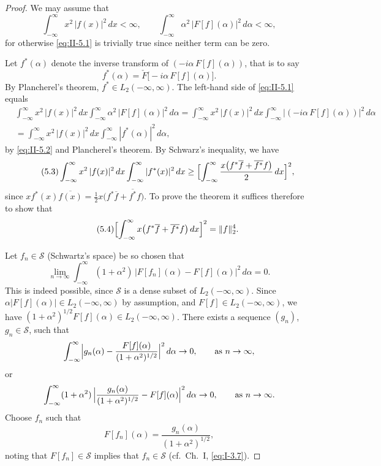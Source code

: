 \begin{proof}
We may assume that
\[
\int_{-\infty}^{\infty}x^{2}\,|f(x)|^{2}\,dx<\infty,\qquad
\int_{-\infty}^{\infty}\alpha^{2}\,|F[f](\alpha)|^{2}\,d\alpha<\infty,
\]
for otherwise \eqref{eq:II-5.1} is trivially true since neither term can be zero.

Let $f^{*}(\alpha)$ denote the inverse transform of $(-i\alpha\,F[f](\alpha))$, that is to say
\begin{equation}\tag{5.2}\label{eq:II-5.2}
f^{*}(\alpha)=\check F\bigl[-i\alpha\,F[f](\alpha)\bigr].
\end{equation}
By Plancherel's theorem, $f^{*}\in L_{2}(-\infty,\infty)$. The left-hand side of \eqref{eq:II-5.1} equals
\[
\begin{aligned}
&\int_{-\infty}^{\infty}x^{2}\,|f(x)|^{2}\,dx
\int_{-\infty}^{\infty}\alpha^{2}\,|F[f](\alpha)|^{2}\,d\alpha
= \int_{-\infty}^{\infty}x^{2}\,|f(x)|^{2}\,dx
\int_{-\infty}^{\infty}\bigl|(-i\alpha\,F[f](\alpha))\bigr|^{2}\,d\alpha\\
&= \int_{-\infty}^{\infty}x^{2}\,|f(x)|^{2}\,dx
\int_{-\infty}^{\infty}|f^{*}(\alpha)|^{2}\,d\alpha,
\end{aligned}
\]
by \eqref{eq:II-5.2} and Plancherel's theorem. By Schwarz's inequality, we have
\begin{equation}\tag{5.3}\label{eq:II-5.3}
\int_{-\infty}^{\infty}x^{2}\,|f(x)|^{2}\,dx
\int_{-\infty}^{\infty}|f^{*}(x)|^{2}\,dx
\ge \Bigl[\int_{-\infty}^{\infty}\frac{x\bigl(f^{*}\overline{f}+\overline{f^{*}}f\bigr)}{2}\,dx\Bigr]^{2},
\end{equation}
since $x f^{*}(x)\overline{f(x)}=\frac{1}{2}x\bigl(f^{*}\overline{f}+\overline{f^{*}}f\bigr)$. To prove the theorem it suffices therefore to show that
\begin{equation}\tag{5.4}\label{eq:II-5.4}
\Bigl[\int_{-\infty}^{\infty}x\bigl(f^{*}\overline{f}+\overline{f^{*}}f\bigr)\,dx\Bigr]^{2}=\|f\|_{2}^{4}.
\end{equation}

Let $f_{n}\in\mathcal S$ (Schwartz's space) be so chosen that
\begin{equation}\tag{5.5}\label{eq:II-5.5}
\lim_{n\to\infty}\int_{-\infty}^{\infty}(1+\alpha^{2})\,
\bigl|F[f_{n}](\alpha)-F[f](\alpha)\bigr|^{2}\,d\alpha=0.
\end{equation}
This is indeed possible, since $\mathcal S$ is a dense subset of $L_{2}(-\infty,\infty)$. Since $\alpha|F[f](\alpha)|\in L_{2}(-\infty,\infty)$ by assumption, and $F[f]\in L_{2}(-\infty,\infty)$, we have $(1+\alpha^{2})^{1/2}F[f](\alpha)\in L_{2}(-\infty,\infty)$. There exists a sequence $(g_{n})$, $g_{n}\in\mathcal S$, such that
\[
\int_{-\infty}^{\infty}\Bigl|g_{n}(\alpha)-\frac{F[f](\alpha)}{(1+\alpha^{2})^{1/2}}\Bigr|^{2}\,d\alpha\to 0,\qquad\text{as }n\to\infty,
\]
or
\[
\int_{-\infty}^{\infty}(1+\alpha^{2})\,
\Bigl|\frac{g_{n}(\alpha)}{(1+\alpha^{2})^{1/2}}-F[f](\alpha)\Bigr|^{2}\,d\alpha\to 0,\qquad\text{as }n\to\infty.
\]
Choose $f_{n}$ such that
\[
F[f_{n}](\alpha)=\frac{g_{n}(\alpha)}{(1+\alpha^{2})^{1/2}},
\]
noting that $F[f_{n}]\in\mathcal S$ implies that $f_{n}\in\mathcal S$ (cf.\ Ch.~I, \eqref{eq:I-3.7}).


\end{proof}
